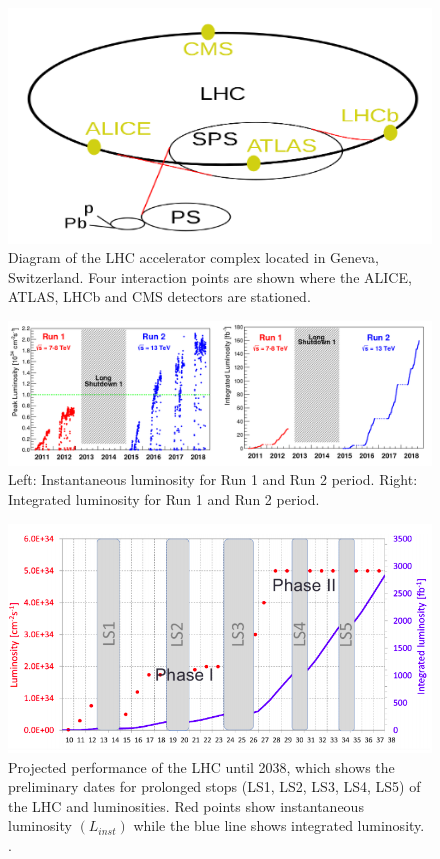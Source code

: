 \begin{figure}[H]
  \centering
  \includegraphics[width=0.8\columnwidth]{./LHCcomplex.png}
  \caption{\onehalfspacing Diagram of the LHC accelerator complex located in Geneva, Switzerland. Four interaction points are shown where the ALICE, ATLAS, LHCb and CMS detectors are stationed. \cite{Mobs:2684277}}
  \label{fig:LHC}
\end{figure}


\begin{figure}[H]
  \centering
  \includegraphics[width=1 \columnwidth]{./peakintlumi_run12.png}
  \caption{\onehalfspacing Left: Instantaneous luminosity for Run 1 and Run 2 period. Right: Integrated luminosity for Run 1 and Run 2 period. \cite{lumi}}
  \label{fig:LHClumi}
\end{figure}


\begin{figure}[H]
  \centering
  \includegraphics[width=0.7 \columnwidth]{./lumi_projection.png}
  \caption{ \onehalfspacing Projected performance of the LHC until 2038, which shows the preliminary dates for prolonged stops (LS1, LS2, LS3, LS4, LS5) of the LHC and luminosities. Red points show instantaneous luminosity $(L_{inst})$ while the blue line shows integrated luminosity. \cite{collaborations2019report}.}
  \label{fig:LHCPlans}
\end{figure}
